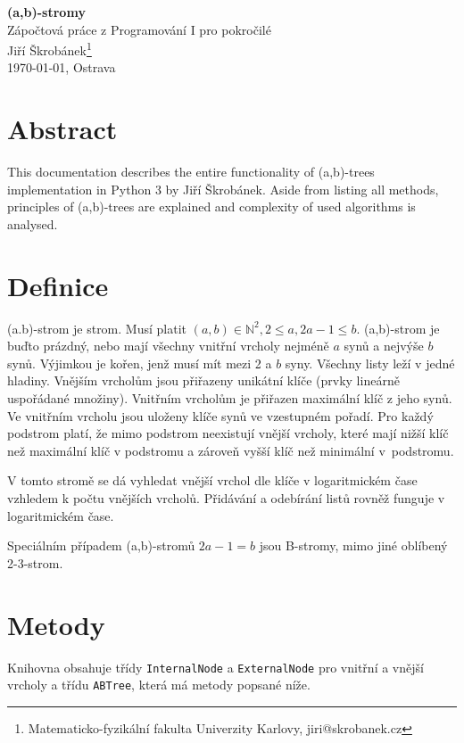 \documentclass[a4paper,11pt,openany]{article}
\begin{document}
\begin{center}
	{\huge \textbf{(a,b)-stromy}}\\\vspace{\baselineskip}Zápočtová práce z Programování I pro pokročilé\\
	\vspace{10mm} {\large Jiří Škrobánek\footnote[1]{Matematicko-fyzikální fakulta Univerzity Karlovy, {\ttfamily jiri@skrobanek.cz}}}\\
	\vspace{10mm}\today, Ostrava
\end{center}

\section*{Abstract}

This documentation describes the entire functionality of (a,b)-trees implementation in Python 3 by Jiří Škrobánek. Aside from listing all methods, principles of (a,b)-trees are explained and complexity of used algorithms is analysed.

\tableofcontents

\section{Definice}
(a.b)-strom je strom. Musí platit $(a,b) \in \mathbb{N}^2, 2 \leq a, 2a - 1 \leq b $. (a,b)-strom je buďto prázdný, nebo mají všechny vnitřní vrcholy nejméně $a$ synů a nejvýše $b$ synů. Výjimkou je kořen, jenž musí mít mezi 2 a $b$ syny. Všechny listy leží v jedné hladiny. Vnějším vrcholům jsou přiřazeny unikátní klíče (prvky lineárně uspořádané množiny). Vnitřním vrcholům je přiřazen maximální klíč z jeho synů. Ve vnitřním vrcholu jsou uloženy klíče synů ve vzestupném pořadí. Pro každý podstrom platí, že mimo podstrom neexistují vnější vrcholy, které mají nižší klíč než maximální klíč v podstromu a zároveň vyšší klíč než minimální v~podstromu.

V tomto stromě se dá vyhledat vnější vrchol dle klíče v logaritmickém čase vzhledem k počtu vnějších vrcholů. Přidávání a odebírání listů rovněž funguje v logaritmickém čase.

Speciálním případem (a,b)-stromů $2a-1=b$ jsou B-stromy, mimo jiné oblíbený 2-3-strom.

\section{Metody}
Knihovna obsahuje třídy \texttt{InternalNode} a \texttt{ExternalNode} pro vnitřní a vnější vrcholy a třídu \texttt{ABTree}, která má metody popsané níže.
\end{document}
